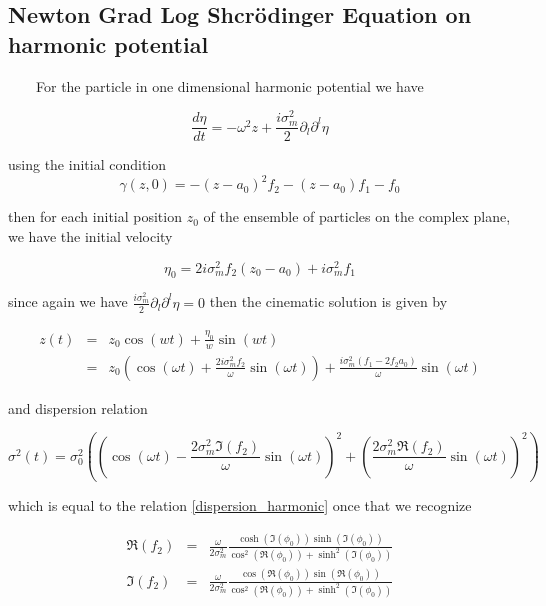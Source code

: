 \documentclass[a4paper,12pt]{article}
\begin{document}

\subsection{Newton Grad Log Shcr\"odinger Equation on harmonic potential}

~~~~For the particle in one dimensional harmonic potential we have

\begin{equation}
\frac{d \eta}{dt} = - \omega^2 z + \frac{i\sigma_m^2}{2 } \partial_l \partial^l \eta
\end{equation}

using the initial condition 
\begin{equation}
\gamma(z,0) = -(z-a_0)^2 f_2 - (z-a_0) f_1 - f_0
\end{equation} 

then for each initial position $z_0$ of the ensemble of particles  on the complex plane, we have the initial velocity

\begin{equation}
\eta_0 = 2 i \sigma_m^2 f_2 (z_0 - a_0) + i \sigma_m^2 f_1
\end{equation}

since again we have $\frac{i\sigma_m^2}{2 } \partial_l \partial^l \eta = 0$ then the cinematic solution is given by

\begin{eqnarray}
z(t) & = & z_0 \cos(wt) + \frac{\eta_0}{w} \sin(wt) \nonumber \\
& = & z_0 \left(  \cos(\omega t) + \frac{2i\sigma_m^2f_2}{\omega} \sin(\omega t)\right) + \frac{i \sigma_m^2 (f_1 -2f_2a_0)}{\omega}\sin(\omega t)
\end{eqnarray}

and dispersion relation

\begin{equation}
\sigma^2(t) = \sigma_0^2\left( \left( \cos(\omega t) - \frac{2\sigma_m^2\Im(f_2)}{\omega} \sin(\omega t) \right)^2 + \left( \frac{2\sigma_m^2\Re(f_2)}{\omega} \sin(\omega t)  \right)^2 \right)
\end{equation}
 
which is equal to the relation \ref{dispersion_harmonic} once that we recognize 

\begin{eqnarray}
\Re(f_2) & = & \frac{\omega}{2\sigma_m^2} \frac{\cosh(\Im(\phi_0)) \sinh(\Im(\phi_0))}{\cos^2(\Re(\phi_0)) + \sinh^2(\Im(\phi_0))}  \\
\Im(f_2) & = & \frac{\omega}{2\sigma_m^2} \frac{\cos(\Re(\phi_0)) \sin(\Re(\phi_0))}{\cos^2(\Re(\phi_0)) + \sinh^2(\Im(\phi_0))} 
\end{eqnarray}
\end{document}
